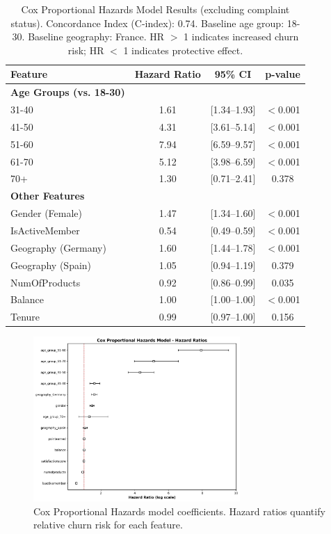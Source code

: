 \documentclass[12pt]{article}
\begin{document}
\begin{table}[H]
\centering
\small
\caption{Cox Proportional Hazards Model Results (excluding complaint status). Concordance Index (C-index): 0.74. Baseline age group: 18-30. Baseline geography: France. HR $>$ 1 indicates increased churn risk; HR $<$ 1 indicates protective effect.}
\label{tab:cox_results}
\begin{tabular}{lccc}
\toprule
\textbf{Feature} & \textbf{Hazard Ratio} & \textbf{95\% CI} & \textbf{p-value} \\
\midrule
\textbf{Age Groups (vs. 18-30)} & & & \\
\phantom{---} 31-40 & 1.61 & [1.34–1.93] & $<$0.001 \\
\phantom{---} 41-50 & 4.31 & [3.61–5.14] & $<$0.001 \\
\phantom{---} 51-60 & 7.94 & [6.59–9.57] & $<$0.001 \\
\phantom{---} 61-70 & 5.12 & [3.98–6.59] & $<$0.001 \\
\phantom{---} 70+ & 1.30 & [0.71–2.41] & 0.378 \\
\midrule
\textbf{Other Features} & & & \\
\phantom{---} Gender (Female) & 1.47 & [1.34–1.60] & $<$0.001 \\
\phantom{---} IsActiveMember & 0.54 & [0.49–0.59] & $<$0.001 \\
\phantom{---} Geography (Germany) & 1.60 & [1.44–1.78] & $<$0.001 \\
\phantom{---} Geography (Spain) & 1.05 & [0.94–1.19] & 0.379 \\
\phantom{---} NumOfProducts & 0.92 & [0.86–0.99] & 0.035 \\
\phantom{---} Balance & 1.00 & [1.00–1.00] & $<$0.001 \\
\phantom{---} Tenure & 0.99 & [0.97–1.00] & 0.156 \\
\bottomrule
\end{tabular}
\end{table}

\begin{figure}[H]
\centering
\includegraphics[width=0.7\textwidth]{../img/14_cox_ph_coefficients.png}
\caption{Cox Proportional Hazards model coefficients. Hazard ratios quantify relative churn risk for each feature.}
\label{fig:cox_coefficients}
\end{figure}
\end{document}
